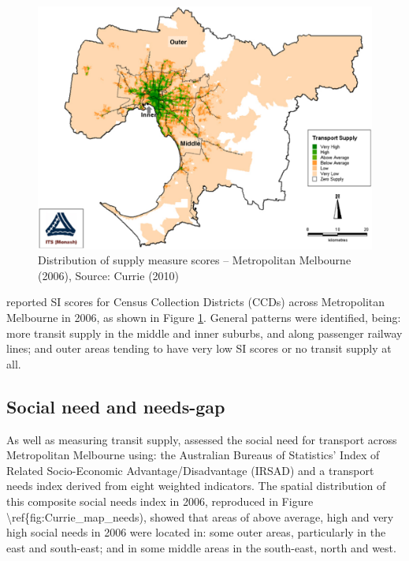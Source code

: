 \documentclass[preprint, 3p,
authoryear]{elsarticle} %
\begin{document}
\begin{figure}
\includegraphics[width=1\linewidth]{graphics/Currie2010SI} \caption{Distribution of supply measure scores – Metropolitan Melbourne (2006), Source: Currie (2010)}\label{fig:Currie_map_SI}
\end{figure}

\citet{currie2010identifying} reported SI scores for Census Collection
Districts (CCDs) across Metropolitan Melbourne in 2006, as shown in
Figure \ref{fig:Currie_map_SI}. General patterns were identified, being:
more transit supply in the middle and inner suburbs, and along passenger
railway lines; and outer areas tending to have very low SI scores or no
transit supply at all.

\subsection{Social need and needs-gap}\label{social-need-and-needs-gap}

As well as measuring transit supply, \citet{currie2010identifying}
assessed the social need for transport across Metropolitan Melbourne
using: the Australian Bureaus of Statistics' Index of Related
Socio-Economic Advantage/Disadvantage (IRSAD) and a transport needs
index derived from eight weighted indicators. The spatial distribution
of this composite social needs index in 2006, reproduced in Figure
\textbackslash ref\{fig:Currie\_map\_needs), showed that areas of above
average, high and very high social needs in 2006 were located in: some
outer areas, particularly in the east and south-east; and in some middle
areas in the south-east, north and west.
\end{document}
